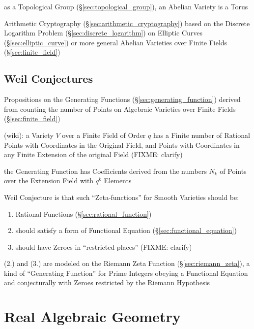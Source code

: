 as a Topological Group (\S\ref{sec:topological_group}), an Abelian Variety is a
Torus %

\fist Arithmetic Cryptography (\S\ref{sec:arithmetic_cryptography}) based on
the Discrete Logarithm Problem (\S\ref{sec:discrete_logarithm}) on Elliptic
Curves (\S\ref{sec:elliptic_curve}) or more general Abelian Varieties over
Finite Fields (\S\ref{sec:finite_field})



\subsection{Weil Conjectures}\label{sec:weil_conjectures}

Propositions on the Generating Functions (\S\ref{sec:generating_function})
derived from counting the number of Points on Algebraic Varieties over Finite
Fields (\S\ref{sec:finite_field})

(wiki): a Variety $V$ over a Finite Field of Order $q$ has a Finite number of
Rational Points with Coordinates in the Original Field, and Points with
Coordinates in any Finite Extension of the original Field (FIXME: clarify)

the Generating Function has Coefficients derived from the numbers $N_k$ of
Points over the Extension Field with $q^k$ Elements

Weil Conjecture is that such ``Zeta-functions'' for Smooth Varieties should be:
\begin{enumerate}
  \item Rational Functions (\S\ref{sec:rational_function})
  \item should satisfy a form of Functional Equation
    (\S\ref{sec:functional_equation})
  \item should have Zeroes in ``restricted places'' (FIXME: clarify)
\end{enumerate}

(2.) and (3.) are modeled on the Riemann Zeta Function
(\S\ref{sec:riemann_zeta}), a kind of ``Generating Function'' for Prime Integers
obeying a Functional Equation and conjecturally with Zeroes restricted by the
Riemann Hypothesis



\section{Real Algebraic Geometry}\label{sec:real_algebraic_geometry}

